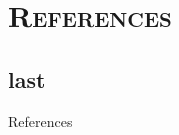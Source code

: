 \documentclass[xcolor=x11names,compress]{beamer}
\renewcommand{\(}{\begin{columns}}
\renewcommand{\)}{\end{columns}}
\newcommand{\<}[1]{\begin{column}{#1}}
\renewcommand{\>}{\end{column}}
\begin{document}

\section{\scshape References}
\subsection{last}
\begin{frame}[shrink=50]{References}
	
	
\end{frame}

\end{document}
